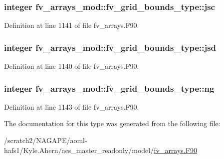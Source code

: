\subsubsection[{jsc}]{\setlength{\rightskip}{0pt plus 5cm}integer fv\-\_\-arrays\-\_\-mod\-::fv\-\_\-grid\-\_\-bounds\-\_\-type\-::jsc}\label{structfv__arrays__mod_1_1fv__grid__bounds__type_a005eba777482ae89181b37df9abebf40}


Definition at line 1141 of file fv\-\_\-arrays.\-F90.

\subsubsection[{jsd}]{\setlength{\rightskip}{0pt plus 5cm}integer fv\-\_\-arrays\-\_\-mod\-::fv\-\_\-grid\-\_\-bounds\-\_\-type\-::jsd}\label{structfv__arrays__mod_1_1fv__grid__bounds__type_aaa96d9e7589d89a41e1cd2d8d3dcae26}


Definition at line 1140 of file fv\-\_\-arrays.\-F90.

\subsubsection[{ng}]{\setlength{\rightskip}{0pt plus 5cm}integer fv\-\_\-arrays\-\_\-mod\-::fv\-\_\-grid\-\_\-bounds\-\_\-type\-::ng}\label{structfv__arrays__mod_1_1fv__grid__bounds__type_a33323e415a0d78a74eec9a56dace6aea}


Definition at line 1143 of file fv\-\_\-arrays.\-F90.



The documentation for this type was generated from the following file\-:\begin{DoxyCompactItemize}
\item 
/scratch2/\-N\-A\-G\-A\-P\-E/aoml-\/hafs1/\-Kyle.\-Ahern/acs\-\_\-master\-\_\-readonly/model/\hyperlink{fv__arrays_8F90}{fv\-\_\-arrays.\-F90}\end{DoxyCompactItemize}
